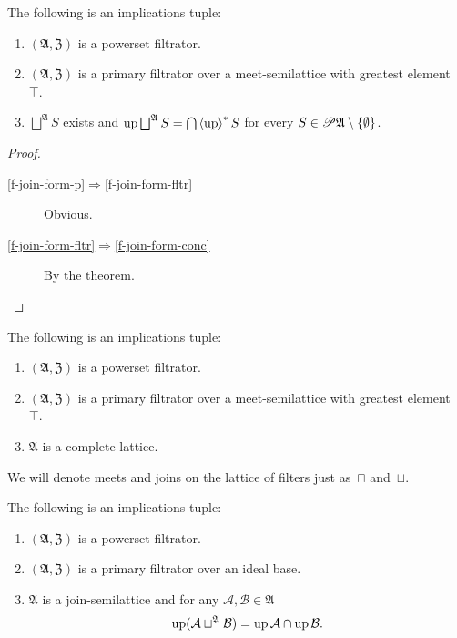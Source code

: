 \begin{cor}
\label{f-join-form}The following is an implications tuple:
\begin{enumerate}
\item \label{f-join-form-p}$(\mathfrak{A},\mathfrak{Z})$ is a powerset
filtrator.
\item \label{f-join-form-fltr}$(\mathfrak{A},\mathfrak{Z})$ is a primary
filtrator over a meet-semilattice with greatest element~$\top$.
\item \label{f-join-form-conc}$\bigsqcup^{\mathfrak{A}}S$ exists and $\up\bigsqcup^{\mathfrak{A}}S=\bigcap\rsupfun{\up}S$
for every $S\in\mathscr{P}\mathfrak{A}\setminus\{\emptyset\}$.
\end{enumerate}
\end{cor}
\begin{proof}
~
\begin{description}
\item [{\ref{f-join-form-p}$\Rightarrow$\ref{f-join-form-fltr}}] Obvious.
\item [{\ref{f-join-form-fltr}$\Rightarrow$\ref{f-join-form-conc}}] By
the theorem.
\end{description}
\end{proof}
\begin{cor}
\label{filt-is-complete}The following is an implications tuple:
\begin{enumerate}
\item $(\mathfrak{A},\mathfrak{Z})$ is a powerset filtrator.
\item $(\mathfrak{A},\mathfrak{Z})$ is a primary filtrator over a meet-semilattice
with greatest element~$\top$.
\item $\mathfrak{A}$ is a complete lattice.
\end{enumerate}
\end{cor}

We will denote meets and joins on the lattice of filters just as~$\sqcap$ and~$\sqcup$.
\begin{prop}
The following is an implications tuple:
\begin{enumerate}
  \item\label{fjoin-ex-pow} $(\mathfrak{A},\mathfrak{Z})$ is a powerset filtrator.
  \item\label{fjoin-ex-flt}  $(\mathfrak{A},\mathfrak{Z})$ is a primary filtrator
    over an ideal base.
  \item\label{fjoin-ex-res}  $\mathfrak{A}$ is a join-semilattice and for
    any $\mathcal{A},\mathcal{B}\in\mathfrak{A}$
\[
\operatorname{up}(\mathcal{A}\sqcup^{\mathfrak{A}}\mathcal{B})=\operatorname{up}\mathcal{A}\cap\operatorname{up}\mathcal{B}.
\]
\end{enumerate}
\end{prop}

